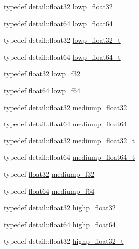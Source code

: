 \begin{DoxyCompactItemize}
\item 
typedef detail\+::float32 \hyperlink{namespaceglm_a92be8087f3c84504f3a44af1a9efc51e}{lowp\+\_\+float32}
\item 
typedef detail\+::float64 \hyperlink{namespaceglm_a32e02689f4e83fb269c9047418536f2c}{lowp\+\_\+float64}
\item 
typedef detail\+::float32 \hyperlink{namespaceglm_adfb453b23cb820e3e4e766e047c67dab}{lowp\+\_\+float32\+\_\+t}
\item 
typedef detail\+::float64 \hyperlink{namespaceglm_ac9d64f4e69d6c2eade41a848077866b5}{lowp\+\_\+float64\+\_\+t}
\item 
typedef \hyperlink{group__gtc__type__precision_ga814f2f65354b6588b067cc5c67a6b340}{float32} \hyperlink{namespaceglm_a1b9734de4b4429dc26b1454a2a399b05}{lowp\+\_\+f32}
\item 
typedef \hyperlink{group__gtc__type__precision_gab721f828b41f46b20cf4883b50733d3b}{float64} \hyperlink{namespaceglm_a59839f4bf6b97c93b0def577890bbfb8}{lowp\+\_\+f64}
\item 
typedef detail\+::float32 \hyperlink{namespaceglm_a1b5f74cbeed0c9d42cd57d77609be7ee}{mediump\+\_\+float32}
\item 
typedef detail\+::float64 \hyperlink{namespaceglm_a9225ae6aed0f90b6eb65bf8d466199c1}{mediump\+\_\+float64}
\item 
typedef detail\+::float32 \hyperlink{namespaceglm_acbd406715148db96c9d9d2a2ef6460de}{mediump\+\_\+float32\+\_\+t}
\item 
typedef detail\+::float64 \hyperlink{namespaceglm_a97a0747b103eb5ef320a91888de52f51}{mediump\+\_\+float64\+\_\+t}
\item 
typedef \hyperlink{group__gtc__type__precision_ga814f2f65354b6588b067cc5c67a6b340}{float32} \hyperlink{namespaceglm_a3dbba6bd06a546d7a11d1c09c2f04b1a}{mediump\+\_\+f32}
\item 
typedef \hyperlink{group__gtc__type__precision_gab721f828b41f46b20cf4883b50733d3b}{float64} \hyperlink{namespaceglm_abd273bd38ea5e013aeec9ffd2b2591fb}{mediump\+\_\+f64}
\item 
typedef detail\+::float32 \hyperlink{namespaceglm_a91af7513c1102410646f2c435ca29be5}{highp\+\_\+float32}
\item 
typedef detail\+::float64 \hyperlink{namespaceglm_ab871a78c548d2fa53e1e8ec64a46eee7}{highp\+\_\+float64}
\item 
typedef detail\+::float32 \hyperlink{namespaceglm_a4e16a7818d09e2da3b81765999f23928}{highp\+\_\+float32\+\_\+t}
\item 

\end{DoxyCompactItemize}
